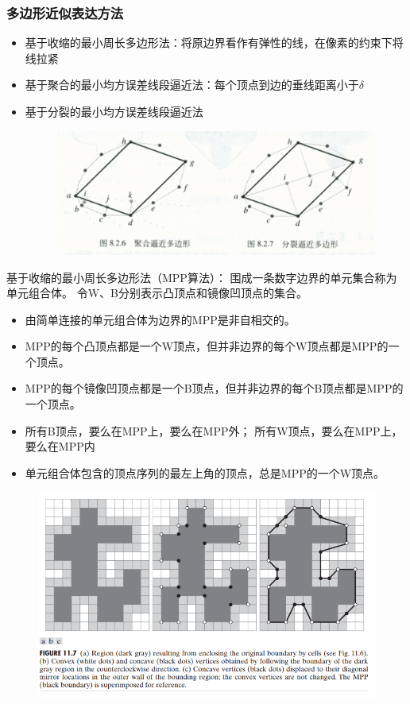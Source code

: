 \subsubsection{多边形近似表达方法}
\begin{itemize}
	\item 基于收缩的最小周长多边形法：将原边界看作有弹性的线，在像素的约束下将线拉紧
	\item 基于聚合的最小均方误差线段逼近法：每个顶点到边的垂线距离小于$\delta$
	\item 基于分裂的最小均方误差线段逼近法
\begin{figure}[H]
\centering
\includegraphics[width=0.8\linewidth]{fig/line_approx.png}
\end{figure}
\end{itemize}

基于收缩的最小周长多边形法（MPP算法）：
围成一条数字边界的单元集合称为单元组合体。
令W、B分别表示凸顶点和镜像凹顶点的集合。
\begin{itemize}
	\item 由简单连接的单元组合体为边界的MPP是非自相交的。
	\item MPP的每个凸顶点都是一个W顶点，但并非边界的每个W顶点都是MPP的一个顶点。
	\item MPP的每个镜像凹顶点都是一个B顶点，但并非边界的每个B顶点都是MPP的一个顶点。
	\item 所有B顶点，要么在MPP上，要么在MPP外；
	所有W顶点，要么在MPP上，要么在MPP内
	\item 单元组合体包含的顶点序列的最左上角的顶点，总是MPP的一个W顶点。
\end{itemize}
\begin{figure}[H]
\centering
\includegraphics[width=0.8\linewidth]{fig/MPP.png}
\end{figure}

